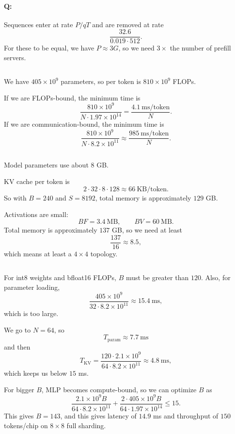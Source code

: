 \documentclass[11pt]{article}
\newcommand{\B}{B}
\newcommand{\F}{F}
\newcommand{\ms}{\mathrm{ms}}
\newcommand{\exercisebreak}{\Needspace{8\baselineskip}}
\newcommand{\quizbreak}{\Needspace{6\baselineskip}}
\begin{document}
\quizbreak
\paragraph{Q:}
Sequences enter at rate $P/qT$ and are removed at rate
\[
  \frac{32.6}{0.019\cdot 512}.
\]
For these to be equal, we have $P\approx 3G$, so we need $3\times$ the number of prefill servers.

\exercisebreak
\subsection{}
We have $405\times 10^9$ parameters, so per token is $810\times 10^9$ FLOPs.

If we are FLOPs-bound, the minimum time is
\[
  \frac{810\times 10^9}{N\cdot 1.97\times 10^{14}}
  =
  \frac{4.1\ \ms/\mathrm{token}}{N}.
\]
If we are communication-bound, the minimum time is
\[
  \frac{810\times 10^9}{N\cdot 8.2\times 10^{11}}
  \approx
  \frac{985\ \ms/\mathrm{token}}{N}.
\]

\exercisebreak
\subsection{}
Model parameters use about $8$ GB.

KV cache per token is
\[
  2\cdot 32\cdot 8\cdot 128
  \approx 66\ \mathrm{KB/token}.
\]
So with $\B=240$ and $S=8192$, total memory is approximately $129$ GB.

Activations are small:
\[
  B\F=3.4\ \mathrm{MB},
  \qquad
  BV=60\ \mathrm{MB}.
\]
Total memory is approximately $137$ GB, so we need at least
\[
  \frac{137}{16}\approx 8.5,
\]
which means at least a $4\times 4$ topology.

\exercisebreak
\subsection{}
For int8 weights and bfloat16 FLOPs, $\B$ must be greater than $120$. Also, for parameter loading,
\[
  \frac{405\times 10^9}{32\cdot 8.2\times 10^{11}}
  \approx 15.4\ \ms,
\]
which is too large.

We go to $N=64$, so
\[
  T_{\mathrm{param}}\approx 7.7\ \ms
\]
and then
\[
  T_{\mathrm{KV}}
  =
  \frac{120\cdot 2.1\times 10^9}{64\cdot 8.2\times 10^{11}}
  \approx 4.8\ \ms,
\]
which keeps us below $15$ ms.

For bigger $\B$, MLP becomes compute-bound, so we can optimize $\B$ as
\[
  \frac{2.1\times 10^9 B}{64\cdot 8.2\times 10^{11}}
  +
  \frac{2\cdot 405\times 10^9 B}{64\cdot 1.97\times 10^{14}}
  \leq 15.
\]
This gives $\B=143$, and this gives latency of $14.9$ ms and throughput of $150$ tokens/chip on $8\times 8$ full sharding.
\end{document}
